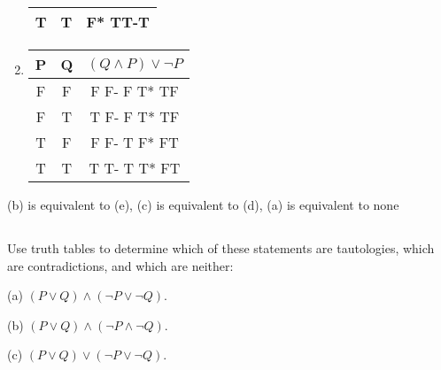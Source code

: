 \documentclass{article}
\begin{document}
\begin{enumerate}[label=(\alph*)]
\begin{center}
\begin{tabular}{||c c c ||}
 \hline
 T & T & F* TT-T\\ [1ex] 
 \hline
\end{tabular}
\end{center}
\item
\begin{center}
 \begin{tabular}{||c c c ||} 
 \hline
 P & Q & $(Q \land P) \lor \neg P$\\ [0.5ex] 
 \hline\hline
 F & F & F F- F T* TF\\ 
 \hline
 F & T & T F- F T* TF\\
 \hline
 T & F & F F- T F* FT\\
 \hline
 T & T & T T- T T* FT\\ [1ex] 
 \hline
\end{tabular}
\end{center}
\end{enumerate}

(b) is equivalent to (e), (c) is equivalent to (d), (a) is equivalent to none
\subsection{}
Use truth tables to determine which of these statements are
tautologies, which are contradictions, and which are neither:

(a) $(P \lor Q) \land (\neg P \lor \neg Q)$.

(b) $(P \lor Q) \land (\neg P \land \neg Q)$.

(c) $(P \lor Q) \lor (\neg P \lor \neg Q)$.
\end{document}

